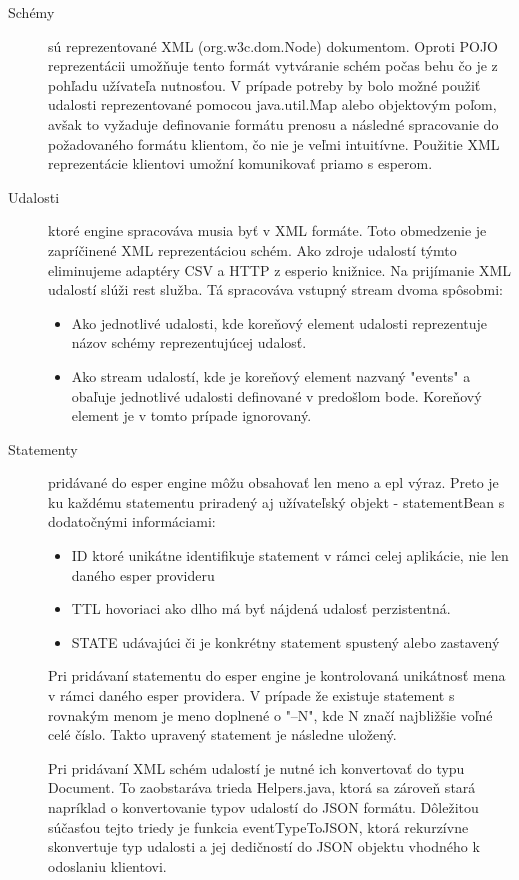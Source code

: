 		\begin{description}
			\item[Schémy] sú reprezentované XML (org.w3c.dom.Node) dokumentom. Oproti POJO reprezentácii umožňuje tento formát vytváranie schém počas behu čo je z pohľadu užívateľa nutnosťou. V prípade potreby by bolo možné použiť udalosti reprezentované pomocou java.util.Map alebo objektovým poľom, avšak to vyžaduje definovanie formátu prenosu a následné spracovanie do požadovaného formátu klientom, čo nie je veľmi intuitívne. Použitie XML reprezentácie klientovi umožní komunikovať priamo s esperom.
			
			\item[Udalosti] ktoré engine spracováva musia byť v XML formáte. Toto obmedzenie je zapríčinené XML reprezentáciou schém. Ako zdroje udalostí týmto eliminujeme adaptéry CSV a HTTP z esperio knižnice. Na prijímanie XML udalostí slúži rest služba. Tá spracováva vstupný stream dvoma spôsobmi:
			\begin{itemize}
				\item Ako jednotlivé udalosti, kde koreňový element udalosti reprezentuje názov schémy reprezentujúcej udalosť.
				\item Ako stream udalostí, kde je koreňový element nazvaný "events" a obaľuje jednotlivé udalosti definované v predošlom bode. Koreňový element je v tomto prípade ignorovaný.
			\end{itemize}
			
			\item[Statementy] pridávané do esper engine môžu obsahovať len meno a epl výraz. Preto je ku každému statementu priradený aj užívateľský objekt - statementBean s dodatočnými informáciami:
			\begin{itemize}
				\item ID ktoré unikátne identifikuje statement v rámci celej aplikácie, nie len daného esper provideru
				\item TTL hovoriaci ako dlho má byť nájdená udalosť perzistentná.
				\item STATE udávajúci či je konkrétny statement spustený alebo zastavený
			\end{itemize}
				

			Pri pridávaní statementu do esper engine je kontrolovaná unikátnosť mena v rámci daného esper providera. V prípade že existuje statement s rovnakým menom je meno doplnené o "--N", kde N značí najbližšie voľné celé číslo. Takto upravený statement je následne uložený.
			
			Pri pridávaní XML schém udalostí je nutné ich konvertovať do typu Document. To zaobstaráva trieda Helpers.java, ktorá sa zároveň stará napríklad o konvertovanie typov udalostí do JSON formátu. Dôležitou súčasťou tejto triedy je funkcia eventTypeToJSON, ktorá rekurzívne skonvertuje typ udalosti a jej dedičností do JSON objektu vhodného k odoslaniu klientovi.
			
		\end{description}
		
